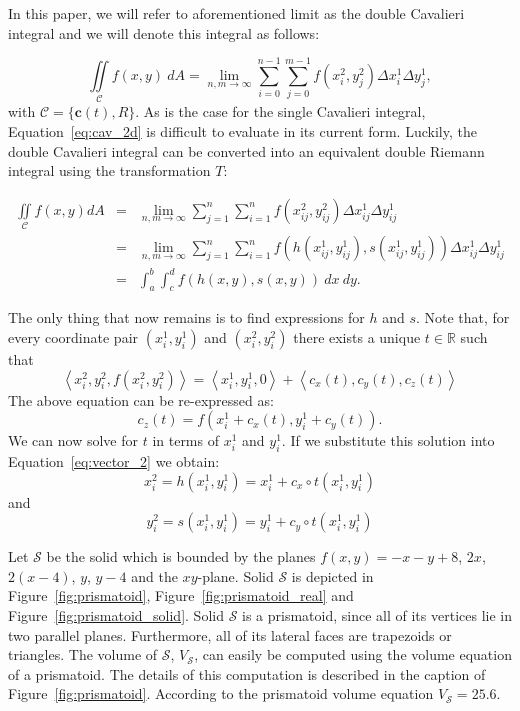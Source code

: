 \documentclass{article}
\theoremstyle{theorem}
\theoremstyle{definition}
\begin{document}
\noindent
In this paper, we will refer to aforementioned limit as the double Cavalieri integral and we will denote this integral as follows:

\begin{equation}
\label{eq:cav_2d}
\iint \limits_{\mathcal{C}} f(x,y)~dA = \lim_{n,m \rightarrow \infty}  \sum_{i=0}^{n-1} \sum_{j=0}^{m-1} f(x_i^2,y_j^2) \Delta x_i^1 \Delta y_j^1,
\end{equation}
with $\mathcal{C} = \{\mathbf{c}(t),R\}$. As is the case for the single Cavalieri integral, Equation~\eqref{eq:cav_2d} is difficult to evaluate in its current form. Luckily, the double 
Cavalieri integral can be converted into an equivalent double Riemann integral using the transformation $T$:

\begin{eqnarray}
\iint\limits_{\!\mathcal{C}} f(x,y) dA &=& \lim_{n,m\rightarrow \infty} \sum_{j=1}^n\sum_{i=1}^n f(x_{ij}^2,y_{ij}^2) \Delta x_{ij}^1\Delta y_{ij}^1\\
&=&  \lim_{n,m\rightarrow \infty} \sum_{j=1}^n\sum_{i=1}^n f(h(x_{ij}^1,y_{ij}^1),s(x_{ij}^1,y_{ij}^1)) \Delta x_{ij}^1\Delta y_{ij}^1\\
&=& \int_a^b\int_c^d f(h(x,y),s(x,y))~dx~dy.
\end{eqnarray}

\noindent
The only thing that now remains is to find expressions for $h$ and $s$. Note that, for every coordinate pair $(x_i^1,y_i^1)$ and $(x_i^2,y_i^2)$ there exists a unique $t\in \mathbb{R}$ such that 
\begin{equation}
\label{eq:vector_2}
\left< x_i^2, y_i^2, f(x_i^2,y_i^2) \right > = \left < x_i^1, y_i^1, 0 \right > + \left <c_x(t),c_y(t),c_z(t)\right >  
\end{equation}
The above equation can be re-expressed as:
\begin{equation}
c_z(t) = f(x_i^1 + c_x(t),y_i^1 + c_y(t)). 
\end{equation}
We can now solve for $t$ in terms of $x_i^1$ and $y_i^1$. If we substitute this solution into Equation~\ref{eq:vector_2} we obtain:
\begin{equation}
x_i^2 = h(x_i^1,y_i^1) = x_i^1 + c_x\circ t(x_i^1,y_i^1) 
\end{equation}
and 
\begin{equation}
y_i^2 = s(x_i^1,y_i^1) = y_i^1 + c_y\circ t(x_i^1,y_i^1) 
\end{equation}



Let $\mathcal{S}$ be the solid which is bounded by the planes $f(x,y)=-x-y+8$, $2x$, $2(x-4)$, $y$, $y-4$ and the $xy$-plane. Solid $\mathcal{S}$ is depicted 
in Figure~\ref{fig:prismatoid}, Figure~\ref{fig:prismatoid_real} and Figure~\ref{fig:prismatoid_solid}. Solid $\mathcal{S}$ is a prismatoid, since all of its 
vertices lie in two parallel planes. Furthermore, all of its lateral faces are trapezoids or triangles. The volume of $\mathcal{S}$, $V_{\mathcal{S}}$, can easily be computed using the 
volume equation of a prismatoid. The details of this computation is described in the caption of Figure~\ref{fig:prismatoid}. According to the prismatoid volume 
equation $V_{\mathcal{S}}=25.6$.
\end{document}
